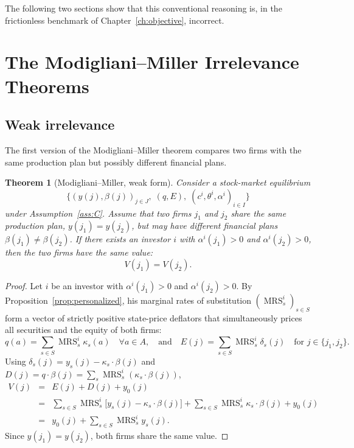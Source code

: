 \documentclass[11pt,a4paper,oneside]{book}
\def\et{\quad \text{and} \quad}
\DeclareMathOperator{\MRS}{MRS}
\theoremstyle{plain}
\newtheorem{theorem}{Theorem}[chapter]
\theoremstyle{definition}
\theoremstyle{remark}
\numberwithin{equation}{chapter}
\begin{document}
The following two sections show that this conventional reasoning is, in the frictionless benchmark of Chapter~\ref{ch:objective}, incorrect.

\section{The Modigliani--Miller Irrelevance Theorems}
\label{sec:mm}

\subsection{Weak irrelevance}

The first version of the Modigliani--Miller theorem compares two firms with the same production plan but possibly different financial plans.

\begin{theorem}[Modigliani--Miller, weak form]\label{thm:mm-weak}
Consider a stock-market equilibrium
\begin{equation*}
  \bigl\{ (y(j), \beta(j))_{j \in J}, \; (q, E), \; (c^i, \theta^i, \alpha^i)_{i \in I} \bigr\}
\end{equation*}
under Assumption~\ref{ass:C}.
Assume that two firms $j_1$ and $j_2$ share the same production plan, $y(j_1) = y(j_2)$, but may have different financial plans $\beta(j_1) \neq \beta(j_2)$.
If there exists an investor $i$ with $\alpha^i(j_1) > 0$ and $\alpha^i(j_2) > 0$, then the two firms have the same value:
\begin{equation}\label{eq:mm-weak}
  V(j_1) = V(j_2).
\end{equation}
\end{theorem}

\begin{proof}
Let $i$ be an investor with $\alpha^i(j_1) > 0$ and $\alpha^i(j_2) > 0$.
By Proposition~\ref{prop:personalized}, his marginal rates of substitution $(\MRS^i_s)_{s \in S}$ form a vector of strictly positive state-price deflators that simultaneously prices all securities and the equity of both firms:
\begin{equation*}
  q(a) = \sum_{s \in S} \MRS^i_s \kappa_s(a) \quad \forall a \in A,
  \et
  E(j) = \sum_{s \in S} \MRS^i_s \delta_s(j) \quad \text{for } j \in \{ j_1, j_2 \}.
\end{equation*}
Using $\delta_s(j) = y_s(j) - \kappa_s \cdot \beta(j)$ and $D(j) = q \cdot \beta(j) = \sum_s \MRS^i_s (\kappa_s \cdot \beta(j))$,
\begin{eqnarray*}
  V(j)
   & = & E(j) + D(j) + y_0(j) \\
   & = & \sum_{s \in S} \MRS^i_s \bigl[y_s(j) - \kappa_s \cdot \beta(j)\bigr] 
  + \sum_{s \in S} \MRS^i_s \kappa_s \cdot \beta(j)
  + y_0(j) \\
   & = & y_0(j) + \sum_{s \in S} \MRS^i_s y_s(j).
\end{eqnarray*}
Since $y(j_1) = y(j_2)$, both firms share the same value.
\end{proof}
\end{document}
